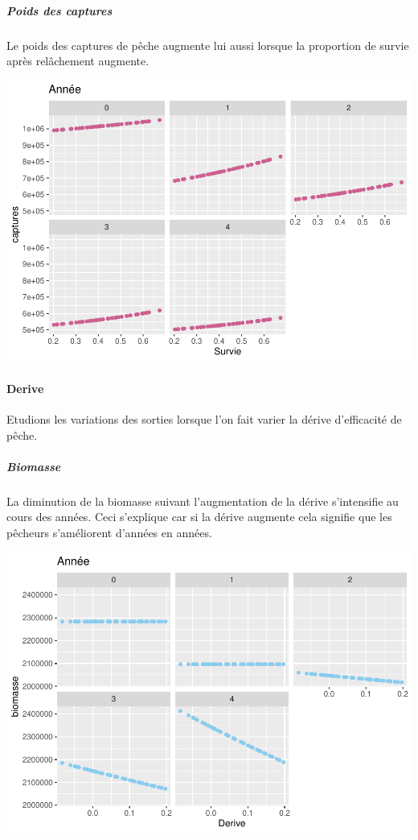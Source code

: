 \documentclass[
]{article}
\begin{document}
\hypertarget{poids-des-captures}{%
\subparagraph{Poids des captures}\label{poids-des-captures}}

Le poids des captures de pêche augmente lui aussi lorsque la proportion
de survie après relâchement augmente.

\includegraphics{rapport_files/figure-latex/azsss-1.pdf}

\hypertarget{derive}{%
\paragraph{Derive}\label{derive}}

Etudions les variations des sorties lorsque l'on fait varier la dérive
d'efficacité de pêche.

\hypertarget{biomasse-2}{%
\subparagraph{Biomasse}\label{biomasse-2}}

La diminution de la biomasse suivant l'augmentation de la dérive
s'intensifie au cours des années. Ceci s'explique car si la dérive
augmente cela signifie que les pêcheurs s'améliorent d'années en années.

\includegraphics{rapport_files/figure-latex/aos-1.pdf}
\end{document}
